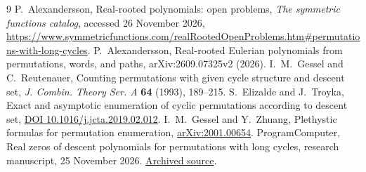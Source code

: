 \documentclass[11pt]{article}
\begin{document}
\begin{thebibliography}{9}
 P.~Alexandersson, Real-rooted polynomials: open problems,
\emph{The symmetric functions catalog}, accessed 26 November 2026,
\url{https://www.symmetricfunctions.com/realRootedOpenProblems.htm#permutations-with-long-cycles}.
 P.~Alexandersson, Real-rooted Eulerian polynomials from permutations, words, and paths,
arXiv:2609.07325v2 (2026).
 I.~M.~Gessel and C.~Reutenauer, Counting permutations with given cycle structure and descent set, \emph{J. Combin. Theory Ser. A} \textbf{64} (1993), 189--215.
 S.~Elizalde and J.~Troyka, Exact and asymptotic enumeration of cyclic permutations according to descent set, \href{https://doi.org/10.1016/j.jcta.2019.02.012}{DOI 10.1016/j.jcta.2019.02.012}.
 I.~M.~Gessel and Y.~Zhuang, Plethystic formulas for permutation enumeration, \href{https://arxiv.org/abs/2001.00654}{arXiv:2001.00654}.
 ProgramComputer, Real zeros of descent polynomials for permutations with long cycles, research manuscript, 25 November 2026. \href{https://github.com/ProgramComputer/open-math-research/blob/4da48b72ed8f92f96c2faf60e2d63d253b3b507a/topics/long-cycle-descents/paper.tex}{Archived source}.
\end{thebibliography}
\end{document}
